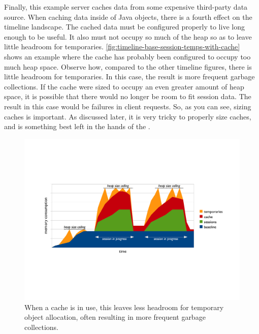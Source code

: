 Finally, this example server caches data from some expensive third-party data
source. When caching data inside of Java objects, there is a fourth effect on
the timeline landscape. The
cached data must be configured properly to live long enough to be useful. It
also must not occupy so much of the heap so as to leave little headroom for
temporaries. \autoref{fig:timeline-base-session-temps-with-cache} shows an
example where the cache has probably been configured to occupy too much heap
space. Observe how, compared to the other timeline figures, there is little
headroom for temporaries. In this case, the result is more frequent garbage
collections. If the cache were sized to occupy an even greater amount of heap
space, it is possible that there would no longer be room to fit session data.
The result in this case would be failures in client requests. So, as you can
see, sizing caches is important. As discussed later, it is very tricky to
properly size caches, and is something best left in the hands of the \jre.

\begin{figure}
	\centering
	\includegraphics[width=\textwidth]{Figures/lifetime/timeline-base-session-temps-with-cache}
	\caption{When a cache is in use, this leaves less headroom for temporary
	object allocation, often resulting in more frequent garbage collections.}
	\label{fig:timeline-base-session-temps-with-cache}
\end{figure}


